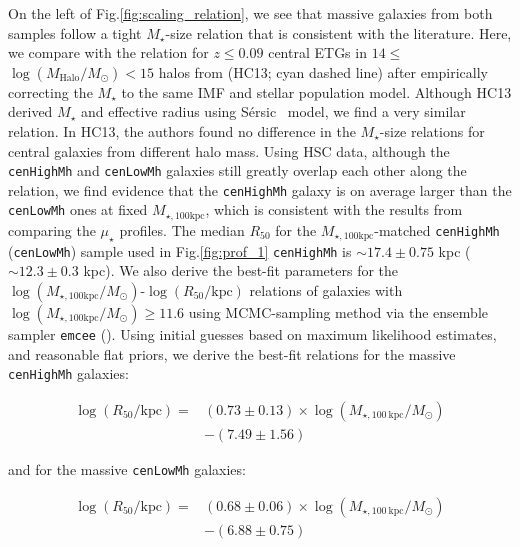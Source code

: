 \documentclass{emulateapj}
\def\ser{{S\'{e}rsic\ }}
\def\rbcg{\texttt{cenHighMh}}
\def\nbcg{\texttt{cenLowMh}}
\def\mstar{{$M_{\star}$}}
\def\logmh{{$\log (M_{\mathrm{Halo}}/M_{\odot})$}}
\def\mtot{{$M_{\star,100\mathrm{kpc}}$}}
\def\logmtot{{$\log (M_{\star,100\mathrm{kpc}}/M_{\odot})$}}
\def\mden{{$\mu_{\star}$}}
\newcommand{\update}[1]{\textcolor{Bittersweet}{#1}}
\begin{document}
\begin{CJK*}{UTF8}{gbsn}
    \update{
    On the left of Fig.\ref{fig:scaling_relation}, we see that massive galaxies from 
    both samples follow a tight \mstar{}-size relation that is consistent with the 
    literature. 
    Here, we compare with the relation for $z\leq 0.09$ central ETGs in  
    $14\le$\logmh{}$<15$ halos from \citealt{HCompany13} (HC13; cyan dashed line) after 
    empirically correcting the \mstar{} to the same IMF and stellar population model. 
    Although HC13 derived \mstar{} and effective radius using \ser{} model, we find
    a very similar relation.  
    In HC13, the authors found no difference in the \mstar{}-size relations for 
    central galaxies from different halo mass.
    Using HSC data, although the \rbcg{} and \nbcg{} galaxies still greatly overlap 
    each other along the relation, we find evidence that the \rbcg{} galaxy is on 
    average larger than the \nbcg{} ones at fixed \mtot{}, which is consistent with 
    the results from comparing the \mden{} profiles. 
    The median $R_{\mathrm{50}}$ for the \mtot{}-matched \rbcg{} (\nbcg{}) sample 
    used in Fig.\ref{fig:prof_1} \rbcg{} is $\sim 17.4\pm 0.75$ kpc 
    ($\sim 12.3\pm0.3$ kpc).
    }
    We also derive the best-fit parameters for the 
    \logmtot{}-$\log (R_{\mathrm{50}}/\mathrm{kpc})$ relations of galaxies with 
    \logmtot{}$\geq 11.6$ using MCMC-sampling method via the ensemble sampler 
    \texttt{emcee} (\citealt{Emcee}). 
    Using initial guesses based on maximum likelihood estimates, and reasonable 
    flat priors, we derive the best-fit relations for the massive \rbcg{} galaxies:
    
    \begin{equation}
        \begin{aligned}
        \log (R_{\mathrm{50}}/\mathrm{kpc}) = & (0.73\pm0.13) \times \log (M_{\star, 100\ \mathrm{kpc}}/M_{\odot}) \\ & -(7.49\pm1.56)
        \end{aligned}
    \end{equation}

    \noindent and for the massive \nbcg{} galaxies:
    
    \begin{equation}
        \begin{aligned}
        \log (R_{\mathrm{50}}/\mathrm{kpc}) = & (0.68\pm0.06) \times \log (M_{\star, 100\ \mathrm{kpc}}/M_{\odot}) \\ & -(6.88\pm0.75)
        \end{aligned}
    \end{equation}
    

\end{CJK*}
\end{document}
